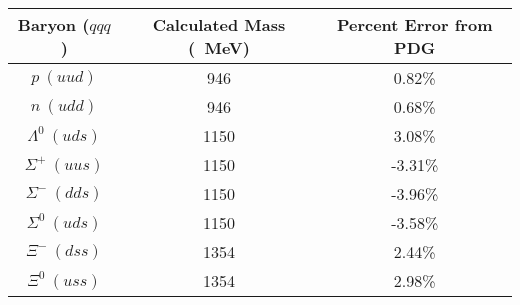 \begin{tabular}{ccc}
\toprule
     Baryon ($qqq$) & Calculated Mass (\qty{}{\MeV}) & Percent Error from PDG \\
\midrule
          $p~(uud)$ &                            946 &                 0.82\% \\
          $n~(udd)$ &                            946 &                 0.68\% \\
$\Lambda^{0}~(uds)$ &                           1150 &                 3.08\% \\
 $\Sigma^{+}~(uus)$ &                           1150 &                -3.31\% \\
 $\Sigma^{-}~(dds)$ &                           1150 &                -3.96\% \\
 $\Sigma^{0}~(uds)$ &                           1150 &                -3.58\% \\
    $\Xi^{-}~(dss)$ &                           1354 &                 2.44\% \\
    $\Xi^{0}~(uss)$ &                           1354 &                 2.98\% \\
\bottomrule
\end{tabular}
